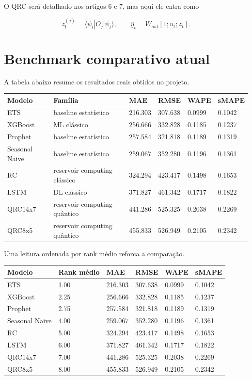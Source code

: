 \documentclass[12pt]{article}
\begin{document}
O QRC será detalhado nos artigos 6 e 7, mas aqui ele entra como

\[
z_t^{(j)} = \langle \psi_t | O_j | \psi_t \rangle,
\qquad
\hat{y}_t = W_{out} [1; u_t; z_t].
\]

\section{Benchmark comparativo atual}\label{5-benchmark-comparativo-atual}

A tabela abaixo resume os resultados reais obtidos no projeto.

\begin{longtable}[]{@{}llllll@{}}
\toprule\noalign{}
Modelo & Família & MAE & RMSE & WAPE & sMAPE \\
\midrule\noalign{}
\endhead
\bottomrule\noalign{}
\endlastfoot
ETS & baseline estatístico & 216.303 & 307.638 & 0.0999 & 0.1042 \\
XGBoost & ML clássico & 256.666 & 332.828 & 0.1185 & 0.1237 \\
Prophet & baseline estatístico & 257.584 & 321.818 & 0.1189 & 0.1319 \\
Seasonal Naive & baseline estatístico & 259.067 & 352.280 & 0.1196 & 0.1361 \\
RC & reservoir computing clássico & 324.294 & 423.417 & 0.1498 & 0.1653 \\
LSTM & DL clássico & 371.827 & 461.342 & 0.1717 & 0.1822 \\
QRC14x7 & reservoir computing quântico & 441.286 & 525.325 & 0.2038 & 0.2269 \\
QRC8x5 & reservoir computing quântico & 455.833 & 526.949 & 0.2105 & 0.2342 \\
\end{longtable}

Uma leitura ordenada por rank médio reforca a comparação.

\begin{longtable}[]{@{}llllll@{}}
\toprule\noalign{}
Modelo & Rank médio & MAE & RMSE & WAPE & sMAPE \\
\midrule\noalign{}
\endhead
\bottomrule\noalign{}
\endlastfoot
ETS & 1.00 & 216.303 & 307.638 & 0.0999 & 0.1042 \\
XGBoost & 2.25 & 256.666 & 332.828 & 0.1185 & 0.1237 \\
Prophet & 2.75 & 257.584 & 321.818 & 0.1189 & 0.1319 \\
Seasonal Naive & 4.00 & 259.067 & 352.280 & 0.1196 & 0.1361 \\
RC & 5.00 & 324.294 & 423.417 & 0.1498 & 0.1653 \\
LSTM & 6.00 & 371.827 & 461.342 & 0.1717 & 0.1822 \\
QRC14x7 & 7.00 & 441.286 & 525.325 & 0.2038 & 0.2269 \\
QRC8x5 & 8.00 & 455.833 & 526.949 & 0.2105 & 0.2342 \\
\end{longtable}
\end{document}
